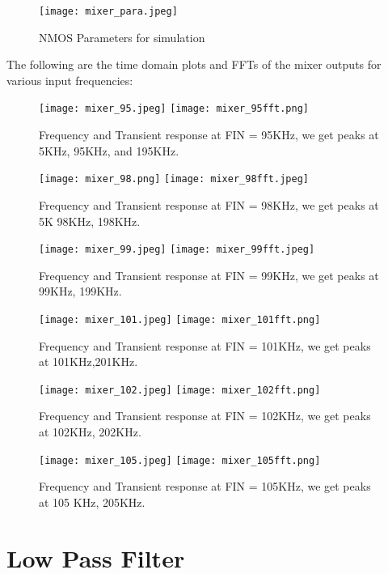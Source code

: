 \documentclass[conference]{IEEEtran}
\begin{document}
\begin{figure}[H]
\centering
\texttt{[image: mixer\_para.jpeg]}
\caption{NMOS Parameters for simulation}
\end{figure}

The following are the time domain plots and FFTs of the
mixer outputs for various input frequencies:

\begin{figure}[H]
\centering
\texttt{[image: mixer\_95.jpeg]}
\texttt{[image: mixer\_95fft.png]}
\caption{Frequency and Transient response at FIN = 95KHz, we get peaks at 5KHz, 95KHz,
and 195KHz.}
\end{figure}

\begin{figure}[H]
\centering
\texttt{[image: mixer\_98.png]}
\texttt{[image: mixer\_98fft.jpeg]}
\caption{Frequency and Transient response at FIN = 98KHz, we get peaks at 5K 98KHz,
198KHz.}
\end{figure}

\begin{figure}[H]
\centering
\texttt{[image: mixer\_99.jpeg]}
\texttt{[image: mixer\_99fft.jpeg]}
\caption{Frequency and Transient response at FIN = 99KHz, we get peaks at 99KHz, 199KHz.}
\end{figure}

\begin{figure}[H]
\centering
\texttt{[image: mixer\_101.jpeg]}
\texttt{[image: mixer\_101fft.png]}
\caption{Frequency and Transient response at FIN = 101KHz, we get peaks at 101KHz,201KHz.}
\end{figure}

\begin{figure}[H]
\centering
\texttt{[image: mixer\_102.jpeg]}
\texttt{[image: mixer\_102fft.png]}
\caption{Frequency and Transient response  at FIN = 102KHz, we get peaks at 102KHz,
202KHz.}
\end{figure}

\begin{figure}[H]
\centering
\texttt{[image: mixer\_105.jpeg]}
\texttt{[image: mixer\_105fft.png]}
\caption{Frequency and Transient response at FIN = 105KHz, we get peaks at 105 KHz,
205KHz.}
\end{figure}

\section{Low Pass Filter}
\end{document}
